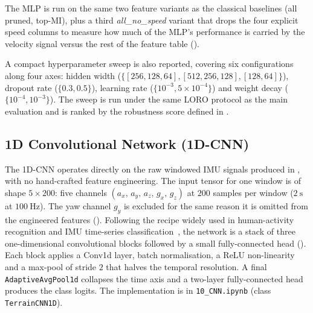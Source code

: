 The MLP is run on the same two feature variants as the classical baselines (all pruned, top-MI), plus a third \emph{all\_no\_speed} variant that drops the four explicit speed columns to measure how much of the MLP's performance is carried by the velocity signal versus the rest of the feature table ().

A compact hyperparameter sweep is also reported, covering six configurations along four axes: hidden width ($\{[256,128,64], [512,256,128], [128,64]\}$), dropout rate ($\{0.3, 0.5\}$), learning rate ($\{10^{-3}, 5\!\times\!10^{-4}\}$) and weight decay ($\{10^{-4}, 10^{-3}\}$). The sweep is run under the same LORO protocol as the main evaluation and is ranked by the robustness score defined in .

\subsection{1D Convolutional Network (1D-CNN)}

The 1D-CNN operates directly on the raw windowed IMU signals produced in , with no hand-crafted feature engineering. The input tensor for one window is of shape $5 \times 200$: five channels $(a_x,\,a_y,\,a_z,\,g_x,\,g_z)$ at $200$ samples per window ($\SI{2}{\second}$ at $\SI{100}{\hertz}$). The yaw channel $g_y$ is excluded for the same reason it is omitted from the engineered features (). Following the recipe widely used in human-activity recognition and IMU time-series classification~\cite{Wang2017,Fawaz2019}, the network is a stack of three one-dimensional convolutional blocks followed by a small fully-connected head (). Each block applies a Conv1d layer, batch normalisation, a ReLU non-linearity and a max-pool of stride $2$ that halves the temporal resolution. A final \texttt{AdaptiveAvgPool1d} collapses the time axis and a two-layer fully-connected head produces the class logits. The implementation is in \texttt{10\_CNN.ipynb} (class \texttt{TerrainCNN1D}).

